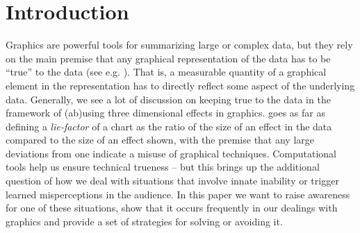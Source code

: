 \documentclass[11pt]{isuthesis}\usepackage[]{graphicx}\usepackage[]{color}
\begin{document}
\section{Introduction}
Graphics are powerful tools for summarizing large or complex data, but they rely on the main premise that any graphical representation of the data has to be ``true'' to the data (see e.g. \citet{tufte, wainer:2000, robbins:2005}). That is, a measurable quantity of a graphical element in the representation has to  directly reflect some aspect of the underlying data. Generally, we see a lot of discussion on keeping true to the data in the framework of (ab)using three dimensional effects in graphics. \cite{tufte} goes as far as defining a {\it lie-factor} of a chart as the ratio of the size of an effect in the data compared to the size of an effect shown, with the premise that any large deviations from one indicate a misuse of graphical techniques. Computational tools help us ensure technical trueness -- but this brings up the additional question of how we deal with situations that involve innate inability or trigger learned misperceptions in the audience. In this paper we want to raise awareness for one of these situations, show that it occurs frequently in our dealings with graphics and provide a set of strategies for solving or avoiding it.
\end{document}
